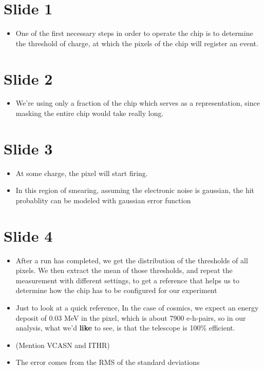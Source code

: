 
\section*{Slide 1}
\begin{itemize}
    \item One of the first necessary steps in order to operate the chip
	is to determine the threshold of charge, at which the pixels of the
	chip will register an event.
\end{itemize}
\section*{Slide 2}
\begin{itemize}
    \item We're using only a fraction of the chip which serves as a
	representation, since masking the entire chip would take really long.
\end{itemize}
\section*{Slide 3} 
\begin{itemize}
    \item At some charge, the pixel will start firing.
    \item In this region of smearing, assuming the electronic noise is
	gaussian, the hit probablity can be modeled with gaussian
	error function
\end{itemize}
\section*{Slide 4}
\begin{itemize}
    \item After a run has completed, we get the distribution of the thresholds
	of all pixels. We then extract the mean of those thresholds, and 
	repeat the measurement with different settings, to get a reference
	that helps us to determine how the chip has to be configured for 
	our experiment
    \item Just to look at a quick reference,
	In the case of cosmics, we expect an energy deposit of 0.03 MeV in
	the pixel, which is about 7900 e-h-pairs, so in our analysis, what
	we'd \textbf{like} to see, is that the telescope is 100\% efficient.
    \item (Mention VCASN and ITHR)
    \item The error comes from the RMS of the standard deviations
\end{itemize}
